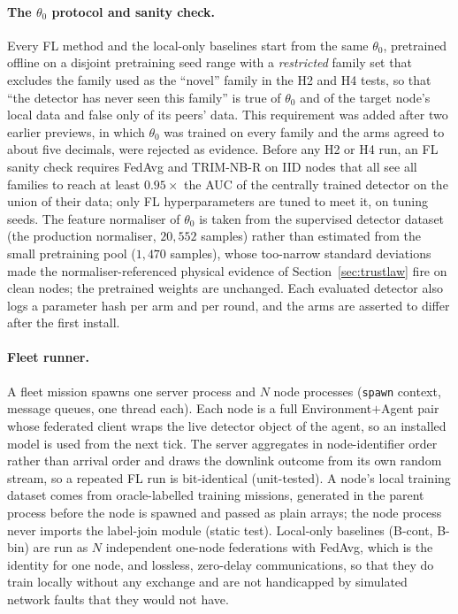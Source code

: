 \documentclass[journal]{IEEEtran}
\begin{document}
\paragraph{The $\theta_0$ protocol and sanity check.}
Every FL method and the local-only baselines start from the same $\theta_0$, pretrained offline on a
disjoint pretraining seed range with a \emph{restricted} family set that excludes the family used as the
``novel'' family in the H2 and H4 tests, so that ``the detector has never seen this family'' is true of
$\theta_0$ and of the target node's local data and false only of its peers' data. This requirement was added
after two earlier previews, in which $\theta_0$ was trained on every family and the arms agreed to about five
decimals, were rejected as evidence. Before any H2 or H4 run, an FL sanity check requires FedAvg and
TRIM-NB-R on IID nodes that all see all families to reach at least $0.95\times$ the AUC of the centrally
trained detector on the union of their data; only FL hyperparameters are tuned to meet it, on tuning seeds.
The feature normaliser of $\theta_0$ is taken from the supervised detector dataset (the production normaliser, $20{,}552$
samples) rather than estimated from the small pretraining pool ($1{,}470$ samples), whose too-narrow standard deviations made the
normaliser-referenced physical evidence of Section~\ref{sec:trustlaw} fire on clean nodes; the pretrained weights are unchanged.
Each evaluated detector also logs a parameter hash per arm and per round, and the arms are asserted to
differ after the first install.

\paragraph{Fleet runner.}
A fleet mission spawns one server process and $N$ node processes (\texttt{spawn} context, message queues,
one thread each). Each node is a full Environment$+$Agent pair whose federated client wraps the live
detector object of the agent, so an installed model is used from the next tick. The server aggregates in
node-identifier order rather than arrival order and draws the downlink outcome from its own random stream,
so a repeated FL run is bit-identical (unit-tested). A node's local training dataset comes from oracle-labelled training
missions, generated in the parent process before the node is spawned and passed as plain arrays; the node
process never imports the label-join module (static test). Local-only baselines (B-cont, B-bin) are run as
$N$ independent one-node federations with FedAvg, which is the identity for one node, and lossless,
zero-delay communications, so that they do train locally without any exchange and are not handicapped by
simulated network faults that they would not have.
\end{document}
